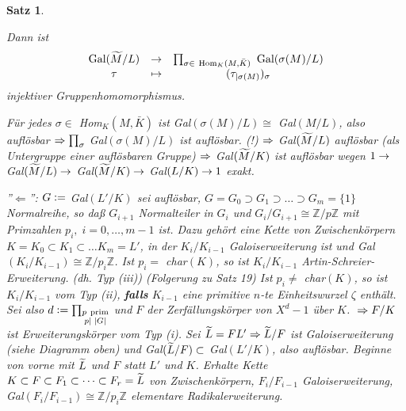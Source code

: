 \documentclass[a4paper,10pt,german]{scrbook}
\theoremstyle{saetze}
\newtheorem{Satz}{Satz}
\theoremstyle{definitionen}
\begin{document}
\begin{Satz}
{\begin{description}
Dann ist \[\begin{array}{ccc} \mbox{Gal}(\widetilde{M}/L) &\rightarrow
&\prod_{\sigma \in \mbox{
\scriptsize Hom}_K(M,\bar K)}\mbox{ Gal}(\sigma(M)/L) \\
\tau &\mapsto &(\tau_{|\sigma(M)})_\sigma \end{array}\] injektiver
Gruppenhomomorphismus.

Für jedes $\sigma \in$ Hom$_K(M,\bar K)$ ist Gal$(\sigma(M)/L)
\cong$ Gal$(M/L)$, also auflösbar $\Rightarrow \prod_\sigma$
Gal$(\sigma(M)/L)$ ist auflösbar. (!) $\Rightarrow$ Gal$(\widetilde{M}/L)$
auflösbar (als Untergruppe einer auflösbaren Gruppe) $\Rightarrow$
Gal$(\widetilde{M}/K)$ ist auflösbar wegen $1 \rightarrow$ Gal$(\widetilde{M}/L) \rightarrow$
Gal$(\widetilde{M}/K) \rightarrow$ Gal$(L/K) \rightarrow 1$ exakt.
\end{description}

''$\Leftarrow$'':
\newline $G \mathrel{\mathop:}=$ Gal$(L'/K)$ sei auflösbar, $G
= G_0 \supset G_1 \supset \dots \supset G_m = \{1\}$ Normalreihe, so
daß $G_{i+1}$ Normalteiler in $G_i$ und $G_i/G_{i+1} \cong
\mathbb{Z}/p\mathbb{Z}$ mit Primzahlen $p_i,\;i=0,\dots,m-1$ ist.
\newline \newline Dazu gehört eine Kette von Zwischenkörpern $K = K_0 \subset K_1
\subset \dots K_m = L'$, in der $K_i/K_{i-1}$ Galoiserweiterung ist
und Gal$(K_i/K_{i-1}) \cong \mathbb{Z}/p_i\mathbb{Z}$.
\newline \newline Ist $p_i =$ char$(K)$, so ist $K_i/K_{i-1}$
Artin-Schreier-Erweiterung. (dh. Typ (iii)) (Folgerung zu Satz 19)
\newline Ist $p_i \neq$ char$(K)$, so ist $K_i/K_{i-1}$ vom Typ (ii), \textbf{falls}
$K_{i-1}$ eine primitive $n$-te Einheitswurzel $\zeta$ enthält.
\newline \newline Sei also $d \mathrel{\mathop:}= \prod_{\substack{p \mbox{ \scriptsize
prim} \\ p |\;|G|}}$ und $F$ der Zerfällungskörper von $X^d - 1$ über $K$.
$\\\Rightarrow F/K$ ist Erweiterungskörper vom Typ (i).
\newline \newline Sei $\widetilde{L} = F L' \Rightarrow \widetilde{L}/F$ ist Galoiserweiterung (siehe
Diagramm oben) und Gal$(\widetilde{L}/F) \subset$ Gal$(L'/K)$, also
auflösbar. Beginne von vorne mit $\widetilde{L}$ und $F$ statt $L'$ und
$K$. Erhalte Kette $K \subset F \subset F_1 \subset \dots \subset
F_r = \widetilde{L}$ von Zwischenkörpern, $F_i/F_{i-1}$ Galoiserweiterung,
Gal$(F_i/F_{i-1}) \cong \mathbb{Z}/p_i\mathbb{Z}$ elementare
Radikalerweiterung.}
\end{Satz}

\end{document}
